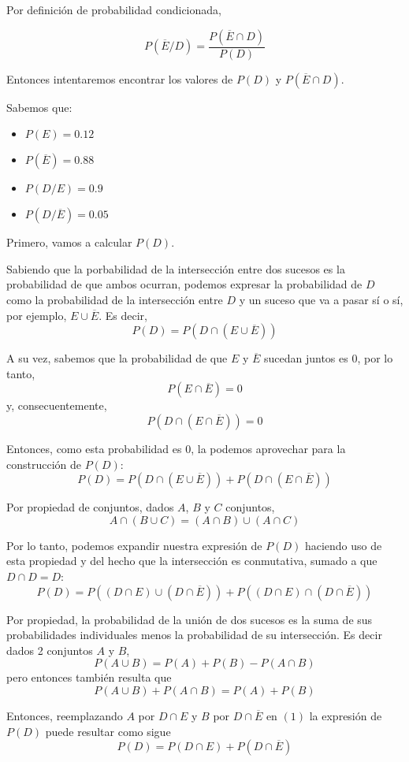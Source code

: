 \documentclass[11pt]{article}
\begin{document}
Por definici\'on de probabilidad condicionada,

\[P(\overline{E}/D) = \frac{P(\overline{E}\cap D)}{P(D)}\]

Entonces intentaremos encontrar los valores de $P(D)$ y $P(\overline{E} \cap D)$.

Sabemos que: 
\begin{itemize}
    \item $P(E) = 0.12$
    \item $P(\overline{E}) = 0.88$
    \item $P(D/E) = 0.9$
    \item $P(D/\overline{E}) = 0.05$
\end{itemize}

Primero, vamos a calcular $P(D)$.

Sabiendo que la porbabilidad de la intersecci\'on entre dos sucesos es la probabilidad de que ambos ocurran, podemos expresar la probabilidad de $D$ como la probabilidad de la intersecci\'on entre $D$ y un suceso que va a pasar s\'i o s\'i, por ejemplo, $E\cup \overline{E}$. Es decir,
\[P(D) = P(D \cap (E \cup \overline{E}))\]

A su vez, sabemos que la probabilidad de que $E$ y $\overline{E}$ sucedan juntos es $0$, por lo tanto, 
\[P(E\cap \overline{E}) = 0\] y, consecuentemente, \[P(D\cap (E \cap \overline{E})) = 0\] 

Entonces, como esta probabilidad es $0$, la podemos aprovechar para la construcci\'on de $P(D)$: 
\[P(D) = P(D \cap (E \cup \overline{E})) + P(D\cap (E \cap \overline{E}))\]

Por propiedad de conjuntos, dados $A$, $B$ y $C$ conjuntos, 
\[A \cap (B\cup C) = (A\cap B) \cup (A\cap C)\]

Por lo tanto, podemos expandir nuestra expresi\'on de $P(D)$ haciendo uso de esta propiedad y del hecho que la intersecci\'on es conmutativa, sumado a que $D\cap D = D$: 
\[P(D) = P((D \cap E) \cup (D \cap \overline{E})) + P((D\cap E) \cap (D \cap \overline{E}))\]

Por propiedad, la probabilidad de la uni\'on de dos sucesos es la suma de sus probabilidades individuales menos la probabilidad de su intersecci\'on. Es decir dados 2 conjuntos $A$ y $B$, 
\[P(A\cup B)= P(A)+P(B)-P(A \cap B)\]
pero entonces tambi\'en resulta que 
\begin{equation}
P(A\cup B) + P(A\cap B) = P(A) + P(B)
\end{equation}

Entonces, reemplazando $A$ por $D\cap E$ y $B$ por $D\cap \overline{E}$ en $(1)$ la expresi\'on de $P(D)$ puede resultar como sigue
\[P(D) = P(D\cap E) + P(D\cap \overline{E})\]
\end{document}
